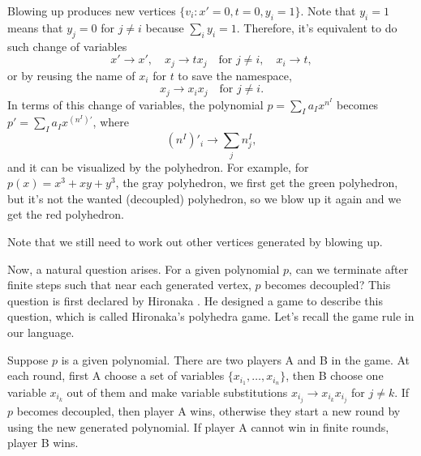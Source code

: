\documentclass[12pt]{article}
\theoremstyle{definition}
\theoremstyle{plain}
\begin{document}
Blowing up produces new vertices 
$
	\{v_i:x'=0,t=0,y_i=1\}
$.
Note that $y_i=1$ means that $y_j=0$ for $j\neq i$ because $\sum_i y_i=1$. Therefore, it's equivalent to 
do such change of variables
\[
	x'\to x',\quad x_j\to tx_j\quad \text{for $j\neq i$},\quad x_i\to t,
\]
or by reusing the name of $x_i$ for $t$ to save the namespace,
\[
	x_j\to x_ix_j\quad \text{for $j\neq i$}.
\]
In terms of this change of variables, the polynomial $p=\sum_I a_I x^{n^I}$ becomes 
$p'=\sum_I a_I x^{(n^I)'}$, where
\[
	(n^I)'_i\longrightarrow \sum_j n^I_j,
\]
and it can be visualized by the polyhedron.
For example, for $p(x)=x^3+xy+y^3$, the gray polyhedron, we first get the green polyhedron, 
but it's not the wanted (decoupled) polyhedron, so we blow up it again and we get the red polyhedron.
\begin{center}
\end{center}
Note that we still need to work out other vertices generated by blowing up. 

Now, a natural question arises. For a given polynomial $p$, 
can we terminate after finite steps such that near each generated vertex, $p$ becomes 
decoupled? This question is first declared by Hironaka \cite{hironaka1967}. 
He designed a game to describe this question, which is 
called Hironaka's polyhedra game. Let's recall the game rule in our language.

Suppose $p$ is a given polynomial. There are two players A and B in the game. 
At each round, first A choose a set of variables $\{x_{i_1},\dots,x_{i_n}\}$, then
B choose one variable $x_{i_k}$ out of them and make variable substitutions
$x_{i_j} \to x_{i_k}x_{i_j}$ for $j\neq k$.
If $p$ becomes decoupled, then player A wins, otherwise they start a new round by using the 
new generated polynomial. If player A cannot win in finite rounds, player B wins.
\end{document}
